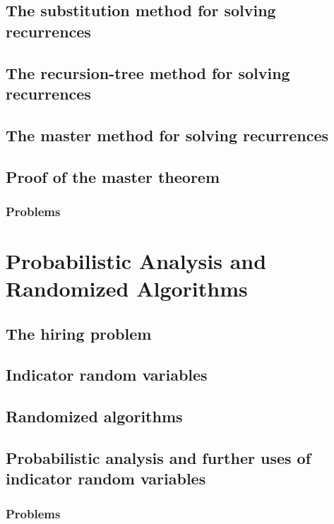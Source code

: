 \documentclass[fontsize=12pt,paper=a4,open=any]{book}
\begin{document}
\section{The substitution method for solving recurrences}

\section{The recursion-tree method for solving recurrences}

\section{The master method for solving recurrences}

\section{Proof of the master theorem}

\subsection*{Problems}


\chapter{Probabilistic Analysis and Randomized Algorithms}

\section{The hiring problem}

\section{Indicator random variables}

\section{Randomized algorithms}

\section{Probabilistic analysis and further uses of indicator random variables}

\subsection*{Problems}
\end{document}
